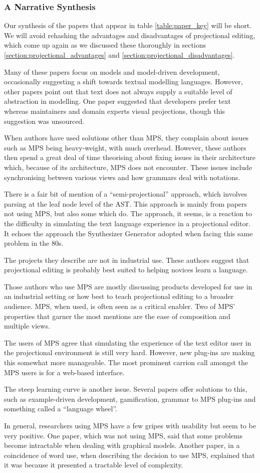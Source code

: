 \subsubsection{A Narrative Synthesis}
Our synthesis of the papers that appear in table \ref{table:paper_key} will be short.
We will avoid rehashing the advantages and disadvantages of projectional editing, which come up again as we discussed these thoroughly in sections \ref{section:projectional_advantages} and \ref{section:projectional_disadvantages}.

Many of these papers focus on models and model-driven development, occasionally suggesting a shift towards textual modelling languages.
However, other papers point out that text does not always supply a suitable level of abstraction in modelling.
One paper suggested that developers prefer text whereas maintainers and domain experts visual projections, though this suggestion was unsourced.

When authors have used solutions other than MPS, they complain about issues such as MPS being heavy-weight, with much overhead.
However, these authors then spend a great deal of time theorising about fixing issues in their architecture which, because of its architecture, MPS does not encounter.
These issues include synchronising between various views and how grammars deal with notations.

There is a fair bit of mention of a ``semi-projectional'' approach, which involves parsing at the leaf node level of the AST.
This approach is mainly from papers not using MPS, but also some which do.
The approach, it seems, is a reaction to the difficulty in simulating the text language experience in a projectional editor. 
It echoes the approach the Synthesizer Generator adopted when facing this same problem in the 80s.

The projects they describe are not in industrial use.
These authors suggest that projectional editing is probably best suited to helping novices learn a language. 

Those authors who use MPS are mostly discussing products developed for use in an industrial setting or how best to teach projectional editing to a broader audience.
MPS, when used, is often seen as a critical enabler.
Two of MPS' properties that garner the most mentions are the ease of composition and multiple views.

The users of MPS agree that simulating the experience of the text editor user in the projectional environment is still very hard.
However, new plug-ins are making this somewhat more manageable.
The most prominent carrion call amongst the MPS users is for a web-based interface.

The steep learning curve is another issue.
Several papers offer solutions to this, such as example-driven development, gamification, grammar to MPS plug-ins and something called a ``language wheel''.

In general, researchers using MPS have a few gripes with usability but seem to be very positive.
One paper, which was not using MPS, said that some problems become intractable when dealing with graphical models.
Another paper, in a coincidence of word use, when describing the decision to use MPS, explained that it was because it presented a tractable level of complexity. 
